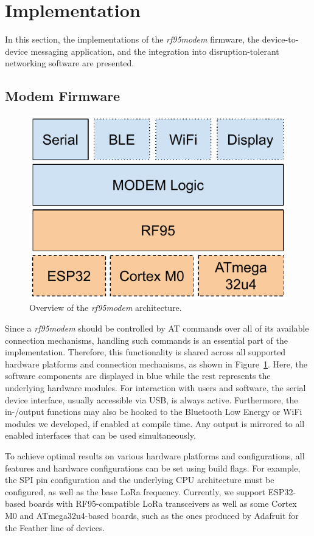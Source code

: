 \section{Implementation}
\label{sec:impl}

In this section, the implementations of the \textit{rf95modem} firmware, the device-to-device messaging application, and the integration into disruption-tolerant networking software are presented.

\subsection{Modem Firmware}

\begin{figure}[ht!]
    \centering
    \includegraphics[width=.5\columnwidth]{gfx/rf95modem-arch.pdf}
    \caption{Overview of the \textit{rf95modem} architecture.}
    \label{fig:rf95modem_arch}
\end{figure}

Since a \textit{rf95modem} should be controlled by AT commands over all of its available connection mechanisms, handling such commands is an essential part of the implementation. 
Therefore, this functionality is shared across all supported hardware platforms and connection mechanisms, as shown in Figure~\ref{fig:rf95modem_arch}. 
Here, the software components are displayed in blue while the rest represents the underlying hardware modules.
For interaction with users and software, the serial device interface, usually accessible via USB, is always active. 
Furthermore, the in-/output functions may also be hooked to the Bluetooth Low Energy or WiFi modules we developed, if enabled at compile time. 
Any output is mirrored to all enabled interfaces that can be used simultaneously. 

To achieve optimal results on various  hardware platforms and configurations, all features and hardware configurations can be set using build flags.
For example, the SPI pin configuration and the underlying CPU architecture must be configured, as well as the base LoRa frequency. 
Currently, we support ESP32-based boards with RF95-compatible LoRa transceivers as well as some Cortex M0 and ATmega32u4-based boards, such as the ones produced by Adafruit for the Feather line of devices.

